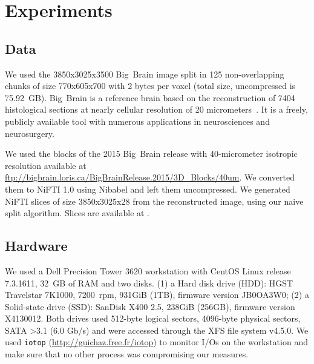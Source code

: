 \documentclass[10pt, conference, compsocconf]{IEEEtran}
\newcommand{\todo}[1]{\marginpar{\parbox{18mm}{\flushleft\tiny\color{red}\textbf{TODO}:
      #1}}}
\begin{document}



\section{Experiments}
\label{sec:experiments}

\subsection{Data}
We used the 3850x3025x3500 Big~Brain image split in 125
non-overlapping chunks of size 770x605x700 with 2 bytes per voxel
(total size, uncompressed is 75.92~GB). Big~Brain is a reference brain
based on the reconstruction of 7404 histological sections at nearly
cellular resolution of 20 micrometers~\cite{amunts2013bigbrain}. It is
a freely, publicly available tool with numerous applications in
neurosciences and neurosurgery.

We used the blocks of the 2015 Big~Brain release with 40-micrometer
isotropic resolution available at
\url{ftp://bigbrain.loris.ca/BigBrainRelease.2015/3D\_Blocks/40um}. We
converted them to NiFTI 1.0 using Nibabel and left them uncompressed.
We generated NiFTI slices of size 3850x3025x28 from the reconstructed
image, using our naive split algorithm. Slices are available at
\todo{\url{x}}.

\subsection{Hardware}

We used a Dell Precision Tower 3620 workstation with CentOS Linux
release 7.3.1611, 32~GB of RAM and two disks. (1) a Hard disk drive
(HDD): HGST Travelstar 7K1000, 7200~rpm, 931GiB (1TB), firmware
version JB0OA3W0; (2) a Solid-state drive (SSD): SanDisk X400 2.5,
238GiB (256GB), firmware version X4130012.  Both drives used 512-byte
logical sectors, 4096-byte physical sectors, SATA \textgreater 3.1 (6.0 Gb/s) and
were accessed through the XFS file system v4.5.0. We used
\texttt{iotop} (\url{http://guichaz.free.fr/iotop}) to monitor I/Os on
the workstation and make sure that no other process was compromising
our measures.
\end{document}
